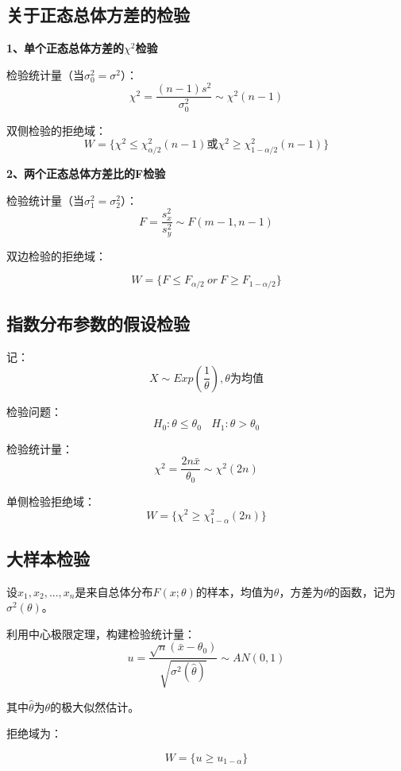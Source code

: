 \documentclass[
]{book}
\begin{document}
\subsection{关于正态总体方差的检验}\label{ux5173ux4e8eux6b63ux6001ux603bux4f53ux65b9ux5deeux7684ux68c0ux9a8c}

\textbf{1、单个正态总体方差的}\(\chi^2\)\textbf{检验}

检验统计量（当\(\sigma^2_0=\sigma^2\)）： \[
\chi^2=\frac{(n-1)s^2}{\sigma_0^2}\sim \chi^2(n-1)
\]

双侧检验的拒绝域： \[
W=\{\chi^2\leq\chi^2_{\alpha/2}(n-1)\text{或}\chi^2\geq\chi^2_{1-\alpha/2}(n-1)\}
\]

\textbf{2、两个正态总体方差比的F检验}

检验统计量（当\(\sigma^2_1=\sigma_2^2\)）： \[
F=\frac{s_x^2}{s_y^2}\sim F(m-1,n-1)
\]

双边检验的拒绝域：

\[
W=\{F\leq F_{\alpha/2}\ or \ F\geq F_{1-\alpha/2} \}
\]

\subsection{指数分布参数的假设检验}\label{ux6307ux6570ux5206ux5e03ux53c2ux6570ux7684ux5047ux8bbeux68c0ux9a8c}

记： \[
X\sim Exp(\frac{1}{\theta}),\theta\text{为均值}
\]

检验问题： \[
H_0:\theta\leq \theta_0 \ \ \ \ H_1:\theta>\theta_0
\]

检验统计量： \[
\chi^2 = \frac{2n\bar{x}}{\theta_0}\sim \chi^2(2n)
\]

单侧检验拒绝域： \[
W=\{\chi^2\geq \chi^2_{1-\alpha}(2n) \}
\]

\subsection{大样本检验}\label{ux5927ux6837ux672cux68c0ux9a8c}

设\(x_1,x_2,...,x_n\)是来自总体分布\(F(x;\theta)\)的样本，均值为\(\theta\)，方差为\(\theta\)的函数，记为\(\sigma^2(\theta)\)。

利用中心极限定理，构建检验统计量： \[
u=\frac{\sqrt{n}(\bar{x}-\theta_0)}{\sqrt{\sigma^2(\hat{\theta})}}\sim AN(0,1)
\]

其中\(\hat{\theta}\)为\(\theta\)的极大似然估计。

拒绝域为：

\[
W=\{u \geq u_{1-\alpha} \}
\]
\end{document}
